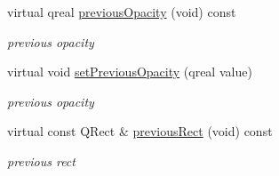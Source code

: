 \begin{DoxyCompactItemize}
virtual qreal \hyperlink{class_menu_bar_data_v1_a70a71c4f5cb0dbe694677add331c4637}{previous\+Opacity} (void) const
\begin{DoxyCompactList}\small\item\em previous opacity \end{DoxyCompactList}\item 
\mbox{\label{class_menu_bar_data_v1_ab027add19e2735b2e66392db961871ab}} 
virtual void \hyperlink{class_menu_bar_data_v1_ab027add19e2735b2e66392db961871ab}{set\+Previous\+Opacity} (qreal value)
\begin{DoxyCompactList}\small\item\em previous opacity \end{DoxyCompactList}\item 
\mbox{\label{class_menu_bar_data_v1_af19820a223852ff1d78bc15a7dac4b84}} 
virtual const Q\+Rect \& \hyperlink{class_menu_bar_data_v1_af19820a223852ff1d78bc15a7dac4b84}{previous\+Rect} (void) const
\begin{DoxyCompactList}\small\item\em previous rect \end{DoxyCompactList}\end{DoxyCompactItemize}

